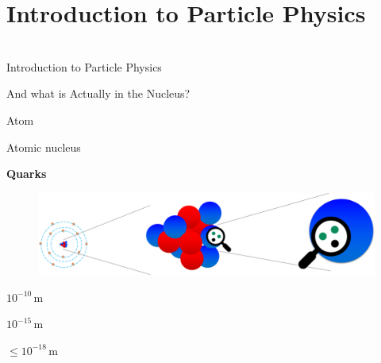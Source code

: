 \section{Introduction to Particle Physics}
\begin{frame}[plain]
   \begin{center} 
  \huge{   }\\
   \Large{Introduction to Particle Physics}
\end{center}
\end{frame}
\begin{frame}[t]{And what is Actually in the Nucleus?}

    \begin{minipage}{\linewidth}
        \begin{minipage}{0.33\linewidth}
             \qquad Atom 
        \end{minipage}     
        \begin{minipage}{0.4\linewidth}
             \quad Atomic nucleus 
        \end{minipage}    
        \begin{minipage}{0.24\linewidth}
            \quad\textbf{Quarks}
        \end{minipage}    
    \end{minipage} \vspace{0.5cm}
    
     \begin{minipage}{0.99\linewidth}
        \begin{figure}
            \centering
            \includegraphics[width=\textwidth]{Figures Introductory Lecture/Standard Model/Scale_Atom_Quark_noText_2.png}
            \label{fig:scale_atom_qaurk}
        \end{figure}
     \end{minipage}  
     \vspace{-15cm}
    \begin{minipage}{\linewidth}
        \begin{minipage}{0.33\linewidth}
            \qquad \Large $10^{-10}$\,m
        \end{minipage}     
        \begin{minipage}{0.33\linewidth}
             \quad \Large $10^{-15}$\,m
        \end{minipage}    
        \begin{minipage}{0.29\linewidth}
            \quad \Large $\leq10^{-18}$\,m
        \end{minipage}    
    \end{minipage}


\end{frame}
